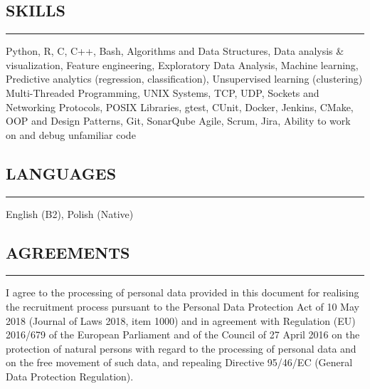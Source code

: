 \documentclass[9pt]{extarticle}
\begin{document}

\subsection*{SKILLS}
\vspace{-1.5em}
\rule{\textwidth}{0.1pt}
Python, R, C, C++, Bash, Algorithms and Data Structures, 
Data analysis \& visualization, Feature engineering, Exploratory Data Analysis,
Machine learning, Predictive analytics (regression, classification), Unsupervised learning (clustering)
Multi-Threaded Programming, UNIX Systems, TCP, UDP, Sockets and Networking Protocols, POSIX Libraries, 
gtest, CUnit, Docker, Jenkins, CMake, OOP and Design Patterns, Git, SonarQube  
Agile, Scrum, Jira, Ability to work on and debug unfamiliar code


\subsection*{LANGUAGES}
\vspace{-1.5em}
\rule{\textwidth}{0.1pt}
English (B2), Polish (Native)

\newpage

\subsection*{AGREEMENTS}
\vspace{-1.5em}
\rule{\textwidth}{0.1pt}
I agree to the processing of personal data provided in this document for realising the recruitment process pursuant to the
Personal Data Protection Act of 10 May 2018 (Journal of Laws 2018, item 1000) and in agreement with Regulation (EU)
2016/679 of the European Parliament and of the Council of 27 April 2016 on the protection of natural persons with regard
to the processing of personal data and on the free movement of such data, and repealing Directive 95/46/EC (General
Data Protection Regulation).

\end{document}
